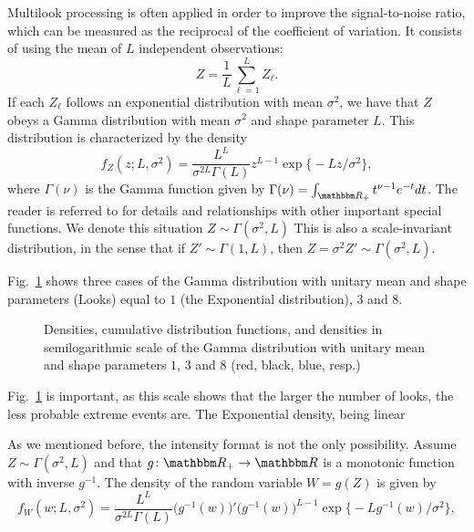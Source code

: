 Multilook processing is often applied in order to improve the signal-to-noise ratio, which can be measured as the reciprocal of the coefficient of variation.
It consists of using the mean of $L$ independent observations:
\begin{equation}
Z = \frac1L \sum_{\ell=1}^{L} Z_\ell.
\end{equation}
If each $Z_\ell$ follows an exponential distribution with mean $\sigma^2$, we have that $Z$ obeys a Gamma distribution with mean $\sigma^2$ and shape parameter $L$.
This distribution is characterized by the density
\begin{equation}
f_Z(z;L,\sigma^2) = \frac{L^L}{\sigma^{2L}\Gamma(L)} z^{L-1} 
	\exp\big\{ -L z / \sigma^2
	\big\},
\end{equation}
where $\Gamma(\nu)$ is the Gamma function given by $\Gamma(\nu)=\int_{\mathbbm R_+} t^{\nu-1} e^{-t} dt$.
The reader is referred to \citet{abramo-stegu64} for details and relationships with other important special functions.
We denote this situation $Z\sim\Gamma(\sigma^2,L)$
This is also a scale-invariant distribution, in the sense that if $Z'\sim\Gamma(1,L)$, then $Z=\sigma^2 Z'\sim \Gamma(\sigma^2,L)$.

Fig.~\ref{Fig:GammaDistribution} shows three cases of the Gamma distribution with unitary mean and shape parameters (Looks) equal to $1$ (the Exponential distribution), $3$ and $8$.

\begin{figure}[hbt]
\centering
{}
\caption[Densities, cumulative distribution functions, and densities in semilogarithmic scale of the Gamma distribution with unitary mean and shape parameters $1$, $3$ and $8$]{Densities, cumulative distribution functions, and densities in semilogarithmic scale of the Gamma distribution with unitary mean and shape parameters $1$, $3$ and $8$ (red, black, blue, resp.)}\label{Fig:GammaDistribution}
\end{figure}

Fig.~\ref{Fig:GammaDistribution} is important, as this scale shows that the larger the number of looks, the less probable extreme events are.
The Exponential density, being linear

As we mentioned before, the intensity format is not the only possibility.
Assume $Z\sim\Gamma(\sigma^2,L)$ and that $g\colon\mathbbm R_+ \to \mathbbm R$ is a monotonic function with inverse $g^{-1}$.
The density of the random variable $W = g(Z)$ is given by 
\begin{equation}
f_W(w;L,\sigma^2) = \frac{L^L}{\sigma^{2L}\Gamma(L)} (g^{-1}(w)\big)' \big(g^{-1}(w)\big)^{L-1} 
	\exp\big\{ -L g^{-1}(w) / \sigma^2
	\big\},
	\label{eq:GammmaTransformed}
\end{equation}

